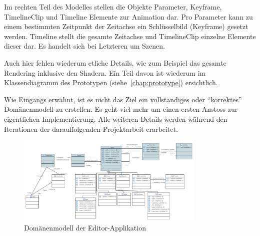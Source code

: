 Im rechten Teil des Modelles stellen die Objekte Parameter, Keyframe,
TimelineClip und Timeline Elemente zur Animation dar. Pro Parameter kann zu
einem bestimmten Zeitpunkt der Zeitachse ein Schlüsselbild (Keyframe) gesetzt
werden. Timeline stellt die gesamte Zeitachse und TimelineClip einzelne
Elemente dieser dar. Es handelt sich bei Letzteren um Szenen.

Auch hier fehlen wiederum etliche Details, wie zum Beispiel das gesamte
Rendering inklusive den Shadern. Ein Teil davon ist wiederum im Klassendiagramm
des Prototypen (siehe~\autoref{chap:prototype}) ersichtlich.

Wie Eingangs erwähnt, ist es nicht das Ziel ein vollständiges oder
``korrektes'' Domänenmodell zu erstellen. Es geht viel mehr um einen ersten
Anstoss zur eigentlichen Implementierung. Alle weiteren Details werden während
den Iterationen der darauffolgenden Projektarbeit erarbeitet.

\begin{figure}[H]
    \centering
    \includegraphics[angle=90,width=0.8\textwidth]{img/editor_domain_model.PDF}
    \caption{Domänenmodell der
        Editor-Applikation}\label{fig:domain-model:editor}
\end{figure}
